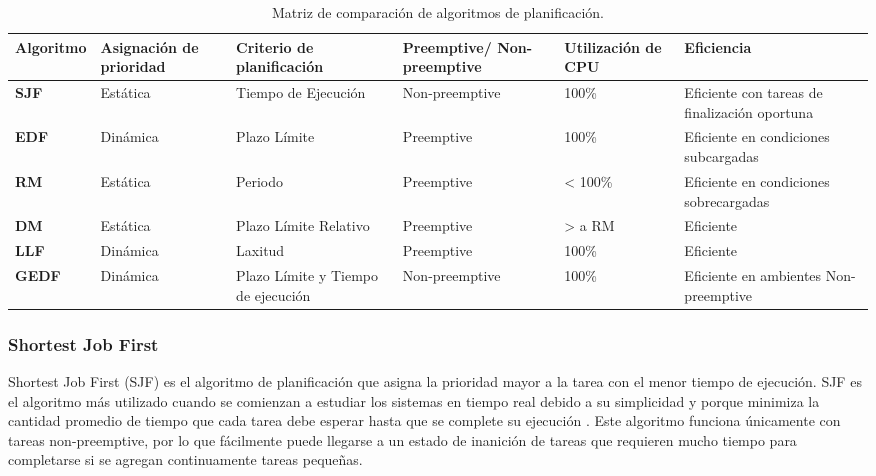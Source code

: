     
        \begin{table}[h!]
      \begin{center}
            \scriptsize
        \begin{tabular}{|m{1.5cm}|m{2cm}|m{2cm}|m{2cm}|m{2cm}|m{3cm}|}
         \hline
        \cellcolor{lightgray}\textbf{Algoritmo} & \cellcolor{lightgray} \textbf{Asignación de prioridad} & \cellcolor{lightgray} \textbf{Criterio de planificación} & \cellcolor{lightgray} \textbf{Preemptive/ Non-preemptive} & \cellcolor{lightgray} \textbf{Utilización de CPU} & \cellcolor{lightgray} \textbf{Eficiencia}  \\ 
         \hline
          \textbf{SJF} & Estática & Tiempo de Ejecución & Non-preemptive & 100\% & Eficiente con tareas de finalización oportuna \\
         \hline
         \textbf{EDF} & Dinámica & Plazo Límite & Preemptive & 100\% & Eficiente en condiciones subcargadas \\
         \hline 
         \textbf{RM} & Estática & Periodo & Preemptive & < 100\% & Eficiente en condiciones sobrecargadas \\
         \hline
          \textbf{DM} & Estática & Plazo Límite Relativo & Preemptive & > a RM & Eficiente \\
         \hline
          \textbf{LLF} & Dinámica & Laxitud & Preemptive & 100\% & Eficiente \\
         \hline
          \textbf{GEDF} & Dinámica & Plazo Límite y Tiempo de ejecución & Non-preemptive & 100\%& Eficiente en ambientes Non-preemptive \\
         \hline
                \end{tabular}
        \caption{Matriz de comparación de algoritmos de planificación.}
        \label{tab:algoTR}
      \end{center}
    \end{table}
    
    \subsubsection{Shortest Job First}
    Shortest Job First (SJF) es el algoritmo de planificación que asigna la prioridad mayor a la tarea con el menor tiempo de ejecución. SJF es el algoritmo más utilizado cuando se comienzan a estudiar los sistemas en tiempo real debido a su simplicidad y porque minimiza la cantidad promedio de tiempo que cada tarea debe esperar hasta que se complete su ejecución \cite{Tanenbaum}. Este algoritmo funciona únicamente con tareas \gls{non-preemptive}, por lo que fácilmente puede llegarse a un estado de inanición de tareas que requieren mucho tiempo para completarse si se agregan continuamente tareas pequeñas.
    
